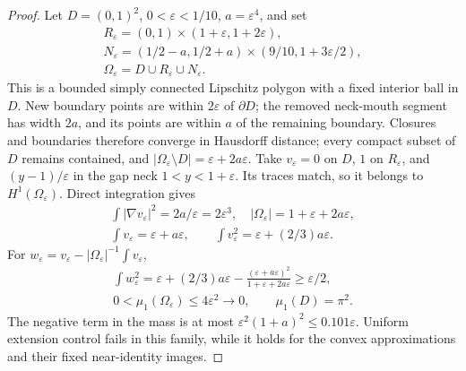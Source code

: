 \documentclass[11pt]{article}
\theoremstyle{definition}
\theoremstyle{remark}
\numberwithin{equation}{section}
\begin{document}
\begin{proof}
Let $D=(0,1)^2$, $0<\varepsilon<1/10$, $a=\varepsilon^4$, and set
\begin{equation}\label{eq:neck-domains}
\begin{gathered}
R_\varepsilon=(0,1)\times(1+\varepsilon,1+2\varepsilon),\\
N_\varepsilon=(1/2-a,1/2+a)\times(9/10,1+3\varepsilon/2),\\
\Omega_\varepsilon=D\cup R_\varepsilon\cup N_\varepsilon.
\end{gathered}
\end{equation}
This is a bounded simply connected Lipschitz polygon with a fixed interior ball in $D$. New boundary points
are within $2\varepsilon$ of $\partial D$; the removed neck-mouth segment has width $2a$, and its points are
within $a$ of the remaining boundary. Closures and boundaries therefore converge in Hausdorff distance;
every compact subset of $D$ remains contained, and $|\Omega_\varepsilon\setminus D|=\varepsilon+2a\varepsilon$.
Take $v_\varepsilon=0$ on $D$, $1$ on $R_\varepsilon$, and $(y-1)/\varepsilon$ in the gap neck
$1<y<1+\varepsilon$. Its traces match, so it belongs to $H^1(\Omega_\varepsilon)$. Direct integration gives
\begin{equation}\label{eq:neck-integrals}
\begin{gathered}
\int|\nabla v_\varepsilon|^2=2a/\varepsilon=2\varepsilon^3,
\quad |\Omega_\varepsilon|=1+\varepsilon+2a\varepsilon,\\
\int v_\varepsilon=\varepsilon+a\varepsilon,
\qquad \int v_\varepsilon^2=\varepsilon+(2/3)a\varepsilon.
\end{gathered}
\end{equation}
For $w_\varepsilon=v_\varepsilon-|\Omega_\varepsilon|^{-1}\int v_\varepsilon$,
\begin{equation}\label{eq:neck-rayleigh}
\begin{gathered}
\int w_\varepsilon^2=\varepsilon+(2/3)a\varepsilon-
\frac{(\varepsilon+a\varepsilon)^2}{1+\varepsilon+2a\varepsilon}\ge\varepsilon/2,\\
0<\mu_1(\Omega_\varepsilon)\le4\varepsilon^2\longrightarrow0,
\qquad \mu_1(D)=\pi^2.
\end{gathered}
\end{equation}
The negative term in the mass is at most $\varepsilon^2(1+a)^2\le0.101\varepsilon$. Uniform extension control
fails in this family, while it holds for the convex approximations and their fixed near-identity images.
\end{proof}
\end{document}
